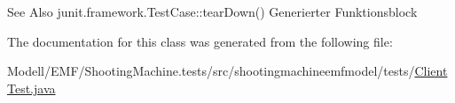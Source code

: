 \begin{DoxySeeAlso}{See Also}
junit.\-framework.\-Test\-Case\-::tear\-Down() Generierter Funktionsblock 
\end{DoxySeeAlso}


The documentation for this class was generated from the following file\-:\begin{DoxyCompactItemize}
\item 
Modell/\-E\-M\-F/\-Shooting\-Machine.\-tests/src/shootingmachineemfmodel/tests/\hyperlink{_client_test_8java}{Client\-Test.\-java}\end{DoxyCompactItemize}
